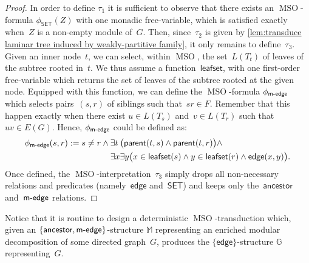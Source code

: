 \documentclass{lmcs} %
\newcommand{\MSO}{\ensuremath{\operatorname{MSO}}\xspace}
\newcommand{\ancestor}{\mathsf{ancestor}}
\newcommand{\parent}{\ensuremath{\mathsf{parent}}\xspace}
\newcommand{\edge}{\ensuremath{\mathsf{edge}}\xspace}
\newcommand{\medge}{\ensuremath{\textsf{m}\text-\mathsf{edge}}\xspace}
\newcommand{\SET}{\ensuremath{\mathsf{SET}}\xspace}
\newcommand{\leafset}{\ensuremath{\mathsf{leafset}}\xspace}
\begin{document}
\begin{proof}
    In order to define $\tau_1$ it is sufficient to observe that
    there exists an \MSO-formula $\phi_{\SET}(Z)$
    with one monadic free-variable,
    which is satisfied exactly when~$Z$ is a non-empty module of~$G$.
    Then, since~$\tau_2$ is given by \autoref{lem:transduce laminar tree induced by weakly-partitive family},
    it only remains to define~$\tau_3$.
    Given an inner node~$t$,
    we can select, within \MSO,
    the set~$L(T_t)$ of leaves of the subtree rooted in~$t$.
    We thus assume a function~$\leafset$,
    with one first-order free-variable
    which returns the set of leaves of the subtree rooted at the given node.
    Equipped with this function,
    we can define the \MSO-formula $\phi_{\medge}$
    which selects pairs~$(s,r)$ of siblings
    such that~$sr\in F$.
    Remember that this happen exactly when there exist $u\in L(T_s)$ and~$v\in L(T_r)$
    such that~$uv\in E(G)$.
    Hence, $\phi_{\medge}$ could be defined as:
    \begin{align*}
        \phi_{\medge}(s, r):=
            s\neq r
            \:\land\:
            &
            \exists t\:
            \big(\parent(t,s)\land\parent(t,r)\big)\land
            \\*&
            \exists x\exists y\big(x\in\leafset(s)\land y\in\leafset(r)\land \edge(x,y)\big).
    \end{align*}
    Once defined, the \MSO-interpretation~$\tau_3$
    simply drops all non-necessary relations and predicates
    (namely~$\edge$ and~$\SET$)
    and keeps only the~$\ancestor$ and~$\medge$ relations.
\end{proof}

Notice that it is routine to design a deterministic \MSO-transduction which,
given an $\{\ancestor,\medge\}$-structure $\mathbb{M}$
representing an enriched modular decomposition of some directed graph~$G$,
produces the $\{\edge\}$-structure $\mathbb{G}$ representing~$G$.
\end{document}
